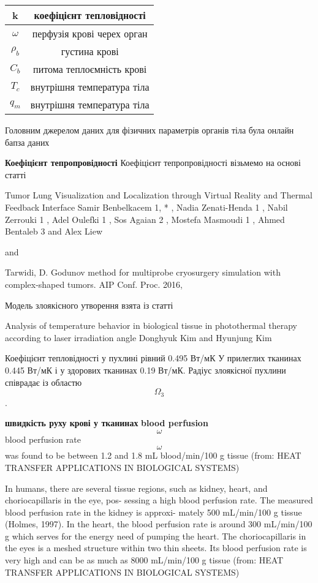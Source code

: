 \begin{center}
    \begin{tabular}{|c|c|} 
        \hline
            k & коефіцієнт тепловідності \\
        \hline
            \(\omega\) & перфузія крові черех орган \\
        \hline
            \(\rho_b\) & густина крові \\
        \hline
            \(C_b\) & питома теплоємність крові \\
        \hline
            \(T_c\) & внутрішня температура тіла \\
        \hline
            \(q_m\) & внутрішня температура тіла \\
        \hline
    \end{tabular}
\end{center}

Головним джерелом даних для фізичних параметрів органів тіла була онлайн бапза даних %

\textbf{Коефіцієнт тепропровідності} Коефіцієнт тепропровідності візьмемо на основі статті

Tumor Lung Visualization and Localization through Virtual
Reality and Thermal Feedback Interface
Samir Benbelkacem 1, * , Nadia Zenati-Henda 1 , Nabil Zerrouki 1 , Adel Oulefki 1 , Sos Agaian 2 ,
Mostefa Masmoudi 1 , Ahmed Bentaleb 3 and Alex Liew

and

Tarwidi, D. Godunov method for multiprobe cryosurgery simulation with complex-shaped tumors. AIP Conf. Proc. 2016,

Модель злоякісного утворення взята із статті

Analysis of temperature behavior in biological tissue in photothermal therapy according
to laser irradiation angle
Donghyuk Kim and Hyunjung Kim

Коефіцієнт тепловідності у пухлині рівний 0.495 Вт/мК
У прилеглих тканинах 0.445 Вт/мК і у здорових тканинах 0.19 Вт/мК.
Радіус злоякісної пухлини співрадає із областю $$\Omega_3$$.

\textbf{швидкість руху крові у тканинах} \textbf{blood perfusion} $$\omega$$ blood perfusion rate $$\omega$$ was found to be between 1.2 and 1.8 mL
blood/min/100 g tissue (from: HEAT TRANSFER APPLICATIONS IN BIOLOGICAL SYSTEMS)

In humans, there are several tissue regions, such as kidney, heart, and choriocapillaris in the eye, pos-
sessing a high blood perfusion rate. The measured blood perfusion rate in the kidney is approxi-
mately 500 mL/min/100 g tissue (Holmes, 1997). In the heart, the blood perfusion rate is around
300 mL/min/100 g which serves for the energy need of pumping the heart. The choriocapillaris in
the eyes is a meshed structure within two thin sheets. Its blood perfusion rate is very high and can
be as much as 8000 mL/min/100 g tissue (from: HEAT TRANSFER APPLICATIONS IN BIOLOGICAL SYSTEMS)


